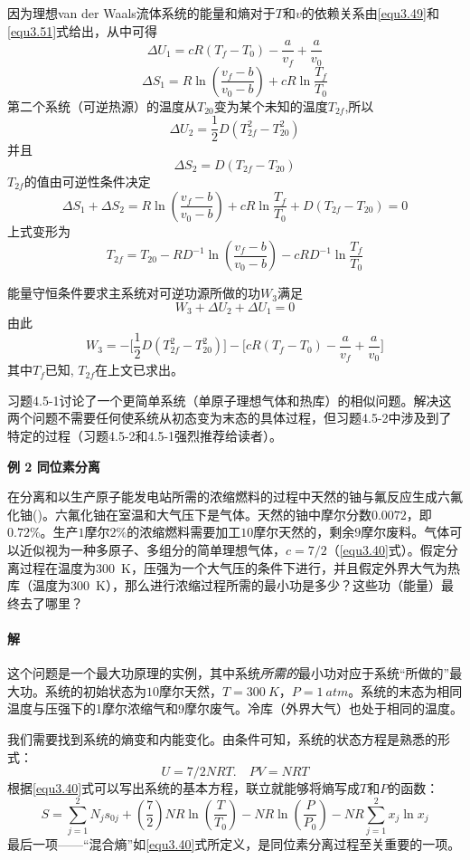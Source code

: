 因为理想van der Waals流体系统的能量和熵对于$T$和$v$的依赖关系由\eqref{equ3.49}和\eqref{equ3.51}式给出，从中可得
\[\Delta U_1 = cR(T_f - T_0) -\frac{a}{v_f} + \frac{a}{v_0}\]
\[\Delta S_1 = R\ln \left(\frac{v_f-b}{v_0-b} \right) + cR\ln\frac{T_f}{T_0}\]
第二个系统（可逆热源）的温度从$T_{20}$变为某个未知的温度$T_{2f}$,所以
\[\Delta U_2 = \frac{1}{2}D(T^2_{2f} - T^2_{20})\]
并且
\[\Delta S_2 = D(T_{2f} - T_{20})\]
$T_{2f}$的值由可逆性条件决定
\[
	\Delta S_1 + \Delta S_2 = R \ln \left( \frac{v_f - b}{v_0 - b} \right) + cR \ln \frac{T_f}{T_0} + D(T_{2f} - T_{20}) = 0
\]
上式变形为
\[
	T_{2f} = T_{20} - RD^{-1} \ln \left( \frac{v_f - b}{v_0 - b} \right) - cRD^{-1} \ln \frac{T_f}{T_0}
\]

能量守恒条件要求主系统对可逆功源所做的功$W_3$满足
\[W_3 + \Delta U_2 + \Delta U_1 = 0\]
由此
\[W_3 = -\Big[ \frac{1}{2} D(T^2_{2f} - T^2_{20}) \Big] - \Big[cR(T_f - T_0)-\frac{a}{v_f}+\frac{a}{v_0} \Big] \]
其中$T_f$已知, $T_{2f}$在上文已求出。

习题4.5-1讨论了一个更简单系统（单原子理想气体和热库）的相似问题。解决这两个问题不需要任何使系统从初态变为末态的具体过程，但习题4.5-2中涉及到了特定的过程（习题4.5-2和4.5-1强烈推荐给读者）。

\textbf{例 2 \quad 同位素分离}

在分离和以生产原子能发电站所需的浓缩燃料的过程中天然的铀与氟反应生成六氟化铀()。六氟化铀在室温和大气压下是气体。天然的铀中摩尔分数$0.0072$，即$0.72 \%$。生产$1$摩尔$2 \%$的浓缩燃料需要加工$10$摩尔天然的，剩余$9$摩尔废料。气体可以近似视为一种多原子、多组分的简单理想气体，$c = 7/2$（\eqref{equ3.40}式）。假定分离过程在温度为\SI{300}{K}，压强为一个大气压的条件下进行，并且假定外界大气为热库（温度为\SI{300}{K}），那么进行浓缩过程所需的最小功是多少？这些功（能量）最终去了哪里？

\paragraph{解} 这个问题是一个最大功原理的实例，其中系统{\it 所需的}最小功对应于系统“所做的”最大功。系统的初始状态为$10$摩尔天然，$T = \SI{300}{K}$，$P = \SI{1}{atm}$。系统的末态为相同温度与压强下的1摩尔浓缩气和9摩尔废气。冷库（外界大气）也处于相同的温度。

我们需要找到系统的熵变和内能变化。由条件可知，系统的状态方程是熟悉的形式：
\[U = 7/2NRT. \quad PV = NRT\]
根据\eqref{equ3.40}式可以写出系统的基本方程，联立就能够将熵写成$T$和$P$的函数：
\[S = \sum_{j=1}^2 N_j s_{0j} + \left( \frac{7}{2} \right) NR \ln \left( \frac{T}{T_0} \right) - NR \ln \left( \frac{P}{P_0} \right)- NR \sum_{j=1}^2  x_j \ln x_j\]
最后一项——“混合熵”如\eqref{equ3.40}式所定义，是同位素分离过程至关重要的一项。

